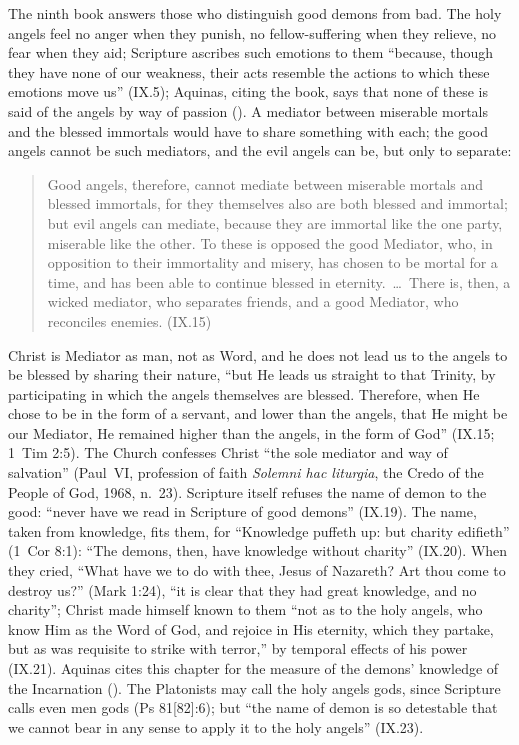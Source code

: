 The ninth book answers those who distinguish good demons from bad. The
holy angels feel no anger when they punish, no fellow-suffering when they
relieve, no fear when they aid; Scripture ascribes such emotions to them
``because, though they have none of our weakness, their acts resemble the
actions to which these emotions move us'' (IX.5); Aquinas, citing the
book, says that none of these is said of the angels by way of passion
(). A mediator
between miserable mortals and the blessed immortals would have to share
something with each; the good angels cannot be such mediators, and the
evil angels can be, but only to separate:
\begin{quote}
Good angels, therefore, cannot mediate between miserable mortals and
blessed immortals, for they themselves also are both blessed and
immortal; but evil angels can mediate, because they are immortal like the
one party, miserable like the other. To these is opposed the good
Mediator, who, in opposition to their immortality and misery, has chosen
to be mortal for a time, and has been able to continue blessed in
eternity.~\dots\ There is, then, a wicked mediator, who separates
friends, and a good Mediator, who reconciles enemies. (IX.15)
\end{quote}
Christ is Mediator as man, not as Word, and he does not lead us to the
angels to be blessed by sharing their nature, ``but He leads us straight
to that Trinity, by participating in which the angels themselves are
blessed. Therefore, when He chose to be in the form of a servant, and
lower than the angels, that He might be our Mediator, He remained higher
than the angels, in the form of God'' (IX.15; 1~Tim 2:5). The Church
confesses Christ ``the sole mediator and way of salvation'' (Paul~VI,
profession of faith \emph{Solemni hac liturgia}, the Credo of the People
of God, 1968, n.~23). Scripture itself refuses the name
of demon to the good: ``never have we read in Scripture of good demons''
(IX.19). The name, taken from knowledge, fits them, for ``Knowledge
puffeth up: but charity edifieth'' (1~Cor 8:1): ``The demons, then, have
knowledge without charity'' (IX.20). When they cried, ``What have we to do
with thee, Jesus of Nazareth? Art thou come to destroy us?'' (Mark 1:24),
``it is clear that they had great knowledge, and no charity''; Christ made
himself known to them ``not as to the holy angels, who know Him as the
Word of God, and rejoice in His eternity, which they partake, but as was
requisite to strike with terror,'' by temporal effects of his power
(IX.21). Aquinas cites this chapter for the measure of the demons'
knowledge of the Incarnation (). The Platonists may
call the holy angels gods, since Scripture calls even men gods (Ps
81[82]:6); but ``the name of demon is so detestable that we cannot bear in
any sense to apply it to the holy angels'' (IX.23).

